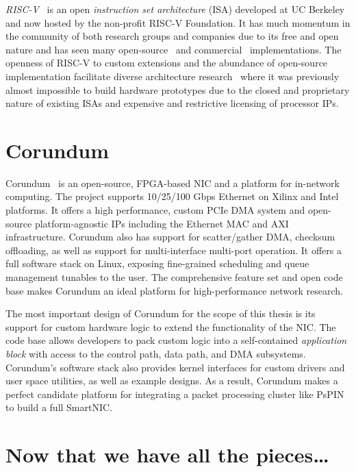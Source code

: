 \emph{RISC-V}~\cite{asanovic_instruction_2014, waterman_risc-v_2019} is an open \emph{instruction set architecture} (ISA) developed at UC Berkeley and now hosted by the non-profit RISC-V Foundation.  It has much momentum in the community of both research groups and companies due to its free and open nature and has seen many open-source~\cite{zhao_sonicboom_2020, asanovic_rocket_2016, rossi_pulp_2015} and commercial~\cite{t-head_t-head_nodate,sifive_sifive_2022} implementations.  The openness of RISC-V to custom extensions and the abundance of open-source implementation facilitate diverse architecture research~\cite{lee_keystone_2020, shao_simba_2019, genc_gemmini_2019, lin_panic_2020, khazraee_rosebud_2023} where it was previously almost impossible to build hardware prototypes due to the closed and proprietary nature of existing ISAs and expensive and restrictive licensing of processor IPs.

\section{Corundum} \label{sec:background-corundum}

Corundum~\cite{forencich_corundum_2020} is an open-source, FPGA-based NIC and a platform for in-network computing.  The project supports 10/25/100 Gbps Ethernet on Xilinx and Intel platforms.  It offers a high performance, custom PCIe DMA system and open-source platform-agnostic IPs including the Ethernet MAC and AXI infrastructure.  Corundum also has support for scatter/gather DMA, checksum offloading, as well as support for multi-interface multi-port operation.  It offers a full software stack on Linux, exposing fine-grained scheduling and queue management tunables to the user.  The comprehensive feature set and open code base makes Corundum an ideal platform for high-performance network research.

The most important design of Corundum for the scope of this thesis is its support for custom hardware logic to extend the functionality of the NIC.  The code base allows developers to pack custom logic into a self-contained \emph{application block} with access to the control path, data path, and DMA subsystems.  Corundum's software stack also provides kernel interfaces for custom drivers and user space utilities, as well as example designs.  As a result, Corundum makes a perfect candidate platform for integrating a packet processing cluster like PsPIN to build a full SmartNIC.

\section*{Now that we have all the pieces\ldots}

